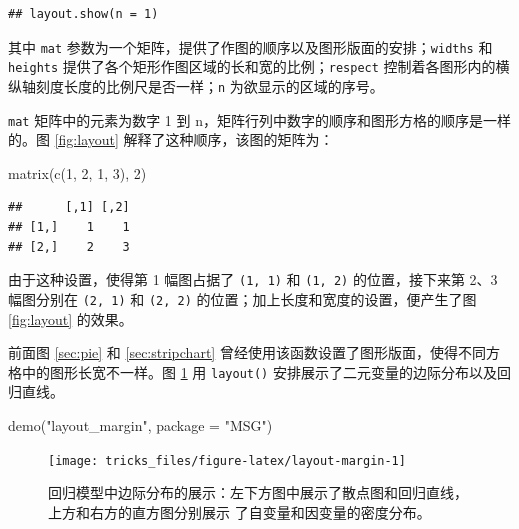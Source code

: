 \documentclass[
  b5paper,
  UTF8,twoside]{book}
\newenvironment{Shaded}{\begin{snugshade}}{\end{snugshade}}
\newcommand{\AttributeTok}[1]{\textcolor[rgb]{0.77,0.63,0.00}{#1}}
\newcommand{\DecValTok}[1]{\textcolor[rgb]{0.00,0.00,0.81}{#1}}
\newcommand{\FunctionTok}[1]{\textcolor[rgb]{0.00,0.00,0.00}{#1}}
\newcommand{\NormalTok}[1]{#1}
\newcommand{\StringTok}[1]{\textcolor[rgb]{0.31,0.60,0.02}{#1}}
\begin{document}
\begin{verbatim}
## layout.show(n = 1)
\end{verbatim}

其中 \texttt{mat} 参数为一个矩阵，提供了作图的顺序以及图形版面的安排；\texttt{widths} 和 \texttt{heights} 提供了各个矩形作图区域的长和宽的比例；\texttt{respect} 控制着各图形内的横纵轴刻度长度的比例尺是否一样；\texttt{n} 为欲显示的区域的序号。

\texttt{mat} 矩阵中的元素为数字 1 到 n，矩阵行列中数字的顺序和图形方格的顺序是一样的。图 \ref{fig:layout} 解释了这种顺序，该图的矩阵为：

\begin{Shaded}
\begin{Highlighting}[]
\FunctionTok{matrix}\NormalTok{(}\FunctionTok{c}\NormalTok{(}\DecValTok{1}\NormalTok{, }\DecValTok{2}\NormalTok{, }\DecValTok{1}\NormalTok{, }\DecValTok{3}\NormalTok{), }\DecValTok{2}\NormalTok{)}
\end{Highlighting}
\end{Shaded}

\begin{verbatim}
##      [,1] [,2]
## [1,]    1    1
## [2,]    2    3
\end{verbatim}

由于这种设置，使得第 1 幅图占据了 \texttt{(1,\ 1)} 和 \texttt{(1,\ 2)} 的位置，接下来第 2、3 幅图分别在 \texttt{(2,\ 1)} 和 \texttt{(2,\ 2)} 的位置；加上长度和宽度的设置，便产生了图 \ref{fig:layout} 的效果。

前面图 \ref{sec:pie} 和 \ref{sec:stripchart} 曾经使用该函数设置了图形版面，使得不同方格中的图形长宽不一样。图 \ref{fig:layout-margin} 用 \texttt{layout()} 安排展示了二元变量的边际分布以及回归直线。

\begin{Shaded}
\begin{Highlighting}[]
\FunctionTok{demo}\NormalTok{(}\StringTok{"layout\_margin"}\NormalTok{, }\AttributeTok{package =} \StringTok{"MSG"}\NormalTok{)}
\end{Highlighting}
\end{Shaded}

\begin{figure}

{\centering \texttt{[image: tricks\_files/figure-latex/layout-margin-1]} 

}

\caption[ 回归模型中边际分布的展示 ]{回归模型中边际分布的展示：左下方图中展示了散点图和回归直线，上方和右方的直方图分别展示 了自变量和因变量的密度分布。}\label{fig:layout-margin}
\end{figure}
\end{document}
